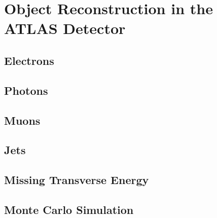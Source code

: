\chapter{Object Reconstruction in the ATLAS Detector} %

\label{ch:reconstruction} 


\section{Electrons}
\section{Photons}
\section{Muons}
\label{sec:reco_muons}
\section{Jets}
\section{Missing Transverse Energy}

\section{Monte Carlo Simulation}


